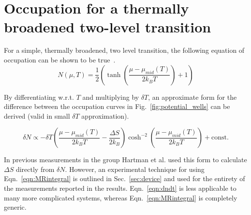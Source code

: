 \section{Occupation for a thermally broadened two-level transition}
\label{sec:twolevel}

For a simple, thermally broadened, two level transition, the following equation of occupation can be shown to be true~\cite{nikentropy}.
\begin{equation}
	\label{eqn:occupation}
	N(\mu, T) = \frac{1}{2} \left( \tanh\left( \frac{\mu - \mu_{mid}(T)}{2k_B T}\right) + 1\right)
\end{equation}

By differentiating w.r.t. $T$ and multiplying by $\delta T$, an approximate form for the difference between the occupation curves in Fig.~\ref{fig:potential_wells} can be derived (valid in small $\delta T$ approximation). 

\begin{equation}
	\label{eqn:dndt}
	\delta N \propto -\delta T \left( \frac{\mu - \mu_{mid}(T)}{2k_B T} - \frac{\Delta S}{2k_B} \right)\cosh^{-2}\left( \frac{\mu - \mu_{mid}(T)}{2k_B T}\right) + \text{const.}
\end{equation}

In previous measurements in the group Hartman et al. used this form to calculate $\Delta S$ directly from $\delta N$. However, an experimental technique for using Eqn.~\ref{eqn:MRintegral} is outlined in Sec.~\ref{sec:device} and used for the entirety of the measurements reported in the results. Eqn.~\ref{eqn:dndt} is less applicable to many more complicated systems, whereas Eqn.~\ref{eqn:MRintegral} is completely generic.


\endinput

Any text after an \endinput is ignored.
You could put scraps here or things in progress.
